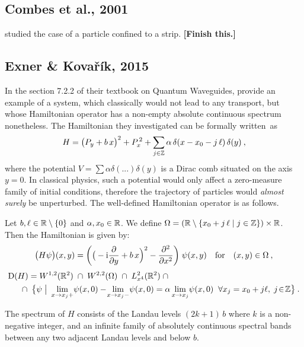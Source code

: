 \subsection{Combes et al., 2001}
\cite{Combes2001} studied the case of a particle confined to a strip.
\textbf{[Finish this.]}

\subsection{Exner \& Kovařík, 2015}
In the section 7.2.2 of their textbook on Quantum Waveguides, \cite{ExnerKovarik2015} provide an example of a system, which classically would not lead to any transport, but whose Hamiltonian operator has a non-empty absolute continuous spectrum nonetheless. The Hamiltonian they investigated can be formally written~as
\begin{equation*}
    H
    = \big(P_y + b \, x \big)^2
    + P_x^{\,2}
    + \sum_{j\in\mathbb{Z}} \alpha \, \delta(x - x_0 - j \, \ell) \, \delta(y)
    \: ,
\end{equation*}
where the potential $V = \sum\alpha\delta(...)\delta(y)$ is a Dirac comb situated on the axis $y=0$. In classical physics, such a potential would only affect a zero-measure family of initial conditions, therefore the trajectory of particles would \textit{almost surely} be unperturbed. The well-defined Hamiltonian operator is as follows.
\begin{defn}
    Let $b, \ell \in \mathbb{R} \setminus \{0\}$ and $\alpha, x_0 \in \mathbb{R}$. We define $\Omega = (\mathbb{R} \setminus \{ x_0 + j \, \ell \;|\; j \in \mathbb{Z} \}) \times \mathbb{R}$. Then the Hamiltonian is given by:
    \begin{equation*}
        \big( H\psi \big)(x, y)
        = \bigg(
            \big(-\mathrm{i}\frac{\partial }{\partial y} + b \, x \Big)^2 - \frac{\partial ^2}{\partial x^2}
        \bigg) \; \psi(x, y)
        \quad
        \text{for}
        \quad
        (x, y) \in \Omega
        \: ,
    \end{equation*}
    \begin{align*}
        \Domain(H)
        &= W^{1,2}(\R^2)
        \;\cap\; W^{2,2}(\Omega)
        \;\cap\; L^2_{x^4}(\R^2)
        \;\cap \\
        &\hspace{-10pt}
        \cap\;
        \big\{
            \psi
            \;\big|\
            \lim_{x \to x_j+}\! \psi(x, 0) - \!\lim_{x \to x_j-}\! \psi(x, 0)
            = \alpha \lim_{x \to x_j}\! \psi(x, 0)
            \;\; \forall x_j = x_0 + j \ell, \; j \!\in\! \Z
        \big\}
        \:.
    \end{align*}
\end{defn}
\begin{thm}
    The spectrum of $H$ consists of the Landau levels $(2k + 1) \, b$ where $k$ is a non-negative integer, and an infinite family of absolutely continuous spectral bands between any two adjacent Landau levels and below $b$.
\end{thm}

